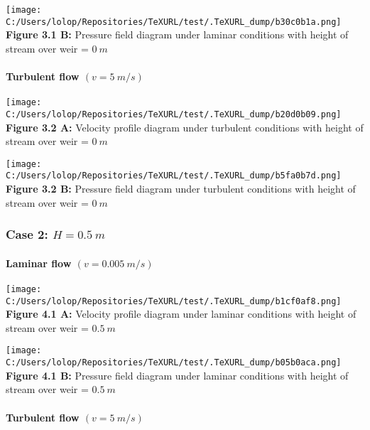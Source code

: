 \documentclass[11pt]{article}
\begin{document}
\texttt{[image: C:/Users/lolop/Repositories/TeXURL/test/.TeXURL\_dump/b30c0b1a.png]} \textbf{Figure 3.1 B:}
Pressure field diagram under laminar conditions with height of stream
over weir = \(0\ m\)

\hypertarget{turbulent-flow-v-5-ms}{%
\paragraph{\texorpdfstring{Turbulent flow
\((v = 5\ m/s)\)}{Turbulent flow (v = 5\textbackslash{} m/s)}}\label{turbulent-flow-v-5-ms}}

\texttt{[image: C:/Users/lolop/Repositories/TeXURL/test/.TeXURL\_dump/b20d0b09.png]} \textbf{Figure 3.2 A:}
Velocity profile diagram under turbulent conditions with height of
stream over weir = \(0\ m\)

\texttt{[image: C:/Users/lolop/Repositories/TeXURL/test/.TeXURL\_dump/b5fa0b7d.png]} \textbf{Figure 3.2 B:}
Pressure field diagram under turbulent conditions with height of stream
over weir = \(0\ m\)

\hypertarget{case-2-h-0.5-m-1}{%
\subsubsection{\texorpdfstring{Case 2:
\(H = 0.5\ m\)}{Case 2: H = 0.5\textbackslash{} m}}\label{case-2-h-0.5-m-1}}

\hypertarget{laminar-flow-v-0.005-ms-1}{%
\paragraph{\texorpdfstring{Laminar flow
\((v = 0.005\ m/s)\)}{Laminar flow (v = 0.005\textbackslash{} m/s)}}\label{laminar-flow-v-0.005-ms-1}}

\texttt{[image: C:/Users/lolop/Repositories/TeXURL/test/.TeXURL\_dump/b1cf0af8.png]} \textbf{Figure 4.1 A:}
Velocity profile diagram under laminar conditions with height of stream
over weir = \(0.5\ m\)

\texttt{[image: C:/Users/lolop/Repositories/TeXURL/test/.TeXURL\_dump/b05b0aca.png]} \textbf{Figure 4.1 B:}
Pressure field diagram under laminar conditions with height of stream
over weir = \(0.5\ m\)

\hypertarget{turbulent-flow-v-5-ms-1}{%
\paragraph{\texorpdfstring{Turbulent flow
\((v = 5\ m/s)\)}{Turbulent flow (v = 5\textbackslash{} m/s)}}\label{turbulent-flow-v-5-ms-1}}
\end{document}
